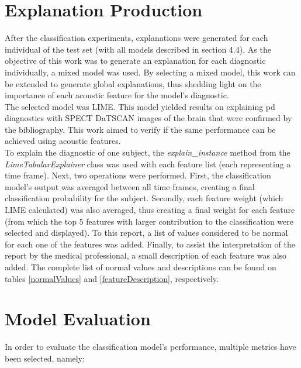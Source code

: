 \section{Explanation Production}

After the classification experiments, explanations were generated for each individual of the test set (with all models described in section 4.4). As the objective of this work was to generate an explanation for each diagnostic individually, a mixed model was used. By selecting a mixed model, this work can be extended to generate global explanations, thus shedding light on the importance of each acoustic feature for the model's diagnostic.
\\
The selected model was LIME. This model yielded results on explaining \gls{pd} diagnostics with SPECT DaTSCAN images of the brain that were confirmed by the bibliography. This work aimed to verify if the same performance can be achieved using acoustic features.
\\
To explain the diagnostic of one subject, the \textit{explain\_instance} method from the \textit{LimeTabularExplainer} class was used with each feature list (each representing a time frame). Next, two operations were performed. First, the classification model's output was averaged between all time frames, creating a final classification probability for the subject. Secondly, each feature weight (which LIME calculated) was also averaged, thus creating a final weight for each feature (from which the top 5 features with larger contribution to the classification were selected and displayed). To this report, a list of values considered to be normal for each one of the features was added. Finally, to assist the interpretation of the report by the medical professional, a small description of each feature was also added. The complete list of normal values and descriptions can be found on tables \ref{normalValues} and \ref{featureDescription}, respectively.

\section{Model Evaluation}

In order to evaluate the classification model's performance, multiple metrics have been selected, namely:

